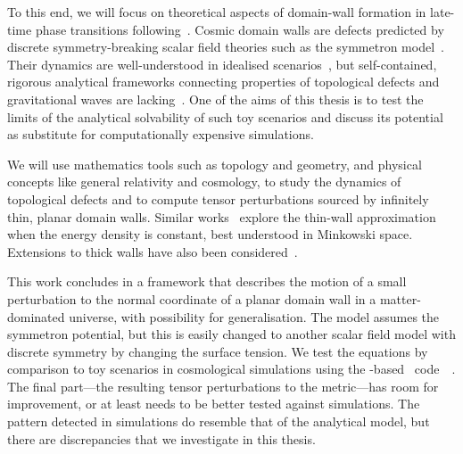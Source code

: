 To this end, we will focus on theoretical aspects of domain-wall formation in late-time phase transitions following~\citet{christiansenGravitationalWavesDark2024,christiansenAsimulationDomainFormation2024}. Cosmic domain walls are defects predicted by discrete symmetry-breaking scalar field theories such as the symmetron model~\citep{hinterbichlerSymmetronCosmology2011}. Their dynamics are well-understood in idealised scenarios~\citep{vachaspatiKinksDomainWalls2006,blanco-pilladoDynamicsDomainWall2023,guvenPerturbationsTopologicalDefect1993,garrigaPerturbationsDomainWalls1991,ishibashiEquationMotionDomain1999}, but self-contained, rigorous analytical frameworks connecting properties of topological defects and gravitational waves are lacking~\citep{saikawaReviewGravitationalWaves2017}. One of the aims of this thesis is to test the limits of the analytical solvability of such toy scenarios and discuss its potential as substitute for computationally expensive simulations. 














We will use mathematics tools such as topology and geometry, and physical concepts like general relativity and cosmology, to study the dynamics of topological defects and to compute tensor perturbations sourced by infinitely thin, planar domain walls. 
Similar works~\cite{blanco-pilladoDynamicsDomainWall2023,ishibashiEquationMotionDomain1999,garrigaPerturbationsDomainWalls1991} explore the thin-wall approximation when the energy density is constant, best understood in Minkowski space. %
Extensions to thick walls have also been considered~\citep{cuttingGravitationalWavesVacuum2021}. %


This work concludes in a framework that describes the motion of a small perturbation to the normal coordinate of a planar domain wall in a matter-dominated universe, with possibility for generalisation. 
The model assumes the symmetron potential, but this is easily changed to another scalar field model with discrete symmetry by changing the surface tension. 
We test the equations by comparison to toy scenarios in cosmological simulations using the \gevolution-based~\citep{adamekGeneralRelativityCosmic2016} code~\asgrd~\citep{christiansenGravitationalWavesDark2024}. %
The final part---the resulting tensor perturbations to the metric---has room for improvement, or at least needs to be better tested against simulations. The pattern detected in simulations do resemble that of the analytical model, but there are discrepancies that we investigate in this thesis.



